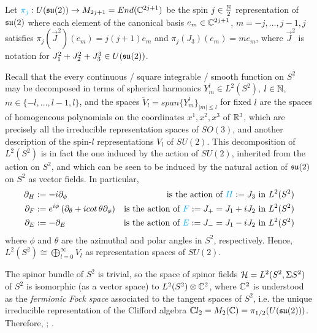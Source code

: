 \lin

Let $\textcolor{cyan}{\pi_j}: U(\mathfrak{su}(2)) \to M_{2j+1} = End(\mathbb{C}^{2j+1})$ be the spin $j \in \frac{\mathbb{N}}{2}$ representation of $\mathfrak{su}(2)$ where each element of the canonical basis $e_m \in \mathbb{C}^{2j+1}$, $m = -j, \dots, j-1, j$ satisfies $\pi_j(\vec J^2)(e_m) = j(j+1) e_m$ and $\pi_j(J_3)(e_m) = m e_m$, where $\vec J^2$ is notation for $J_1^2 + J_2^2 + J_3^3 \in U(\mathfrak{su}(2))$.

Recall that the every continuous / square integrable / smooth function on $S^2$ may be decomposed in terms of spherical harmonics $Y^l_m \in L^2(S^2)$, $l \in \mathbb{N}$, $m \in \{-l, \dots, l-1, l\}$, and the spaces $\tilde V_l = span\{Y^l_m\}_{|m| \leq l}$ for fixed $l$ are the spaces of homogeneous polynomials on the coordinates $x^1, x^2, x^3$ of $\mathbb{R}^3$, which are precisely all the irreducible representation spaces of $SO(3)$, and another description of the spin-$l$ representations $V_l$ of $SU(2)$. 
This decomposition of $L^2(S^2)$ is in fact the one induced by the action of $SU(2)$, inherited from the action on $S^2$, and which can be seen to be induced by the natural action of $\mathfrak{su}(2)$ on $S^2$ as vector fields. In particular, 
\begin{align}
    \partial_H &:= - i \partial_\phi & \text{is the action of $\lbtext{H} := J_3$ in $L^2(S^2)$} \\
    \partial_F &:= e^{i\phi} \left( \partial_\theta + i cot\,\theta \partial_\phi \right) &\text{is the action of $\lbtext{F} := J_+ = J_1 + i J_2$ in $L^2(S^2)$}\\
    \partial_E &:= - \partial_E &\text{is the action of $\lbtext{E} := J_- = J_1 - i J_2$ in $L^2(S^2)$}
\end{align} where $\phi$ and $\theta$ are the azimuthal and polar angles in $S^2$, respectively.
Hence, $L^2(S^2) \cong \bigoplus_{l = 0}^\infty V_l$ as representation spaces of $SU(2)$.

The spinor bundle of $S^2$ is trivial, so the space of spinor fields $\mathcal H = L^2(S^2, \Sigma S^2)$ of $S^2$ is isomorphic (as a vector space) to $L^2(S^2) \otimes \mathbb{C}^2$, where $\mathbb{C}^2$ is understood as the \textit{fermionic Fock space} associated to the tangent spaces of $S^2$, i.e. the unique irreducible representation of the Clifford algebra $\mathbb{C} l_2 = M_2(\mathbb{C}) = \pi_{1/2}(U(\mathfrak{su}(2)))$. Therefore, ; .

